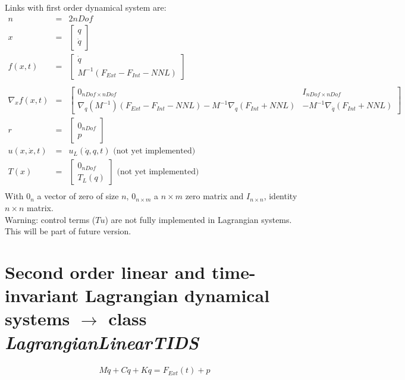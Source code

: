 \documentclass[10pt]{report}
\begin{document}
Links with first order dynamical system are:
\begin{eqnarray}
  n &= &2nDof \\
  x &=&\left[\begin{array}{c}q \\ \dot q \end{array}\right] \\
  f(x,t) &=&  \left[\begin{array}{c} \dot q \\ M^{-1}(F_{Ext}-F_{Int}-NNL) \end{array}\right] \\
  \\
  \nabla_x f(x,t) &=&
  \left[\begin{array}{cc}
      0_{nDof\times nDof} & I_{nDof\times nDof} \\
      \nabla_q(M^{-1})(F_{Ext}-F_{Int}-NNL) -M^{-1}\nabla_q(F_{Int}+NNL) &  -M^{-1}\nabla_{\dot q}(F_{Int}+NNL)
    \end{array}\right] \\
  r &=& \left[\begin{array}{c} 0_{nDof} \\ p \end{array}\right] \\
  u(x,\dot x,t) &=& u_L(\dot q, q, t) \text{  (not yet implemented)} \\
  T(x) &=& \left[\begin{array}{c} 0_{nDof} \\ T_L(q) \end{array}\right] \text{  (not yet implemented)} \\
\end{eqnarray}
With $0_{n}$ a vector of zero of size $n$, $0_{n\times m}$ a $n\times m$ zero matrix and
$I_{n\times n}$, identity $n\times n$ matrix. \\

Warning: control terms ($Tu$) are not fully implemented in Lagrangian systems. This will be part of future version.

\section{Second order linear and time-invariant Lagrangian dynamical systems $\rightarrow$ class \it{LagrangianLinearTIDS}}
\label{Sec:LagrangianLineatTIDS}
\begin{eqnarray}
M \ddot q + C \dot q + K q =  F_{Ext}(t) + p
\end{eqnarray}
\end{document}
